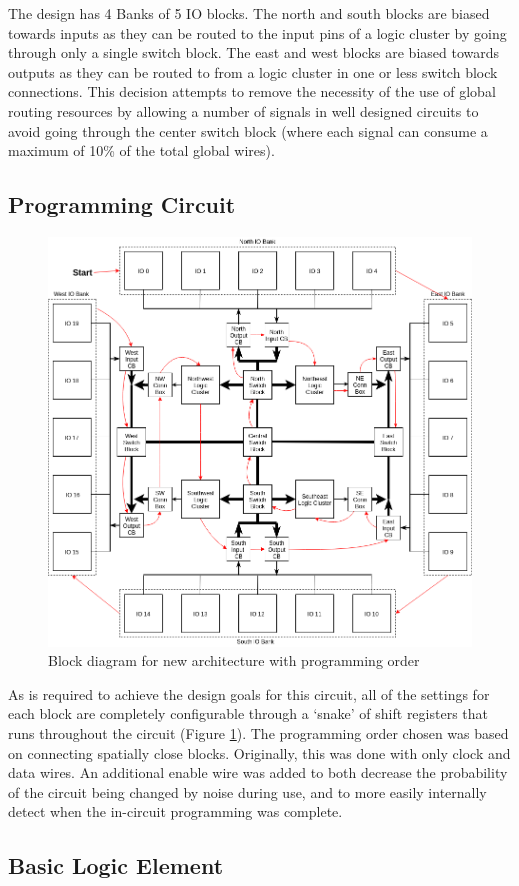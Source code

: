 \documentclass[12pt]{article}
\begin{document}
The design has 4 Banks of 5 IO blocks. The north and south blocks are biased towards inputs
as they can be routed to the input pins of a logic cluster by going through only a single switch
block. The east and west blocks are biased towards outputs as they can be routed to from a logic
cluster in one or less switch block connections. This decision attempts to remove the necessity 
of the use of global routing resources by allowing a number of signals
in well designed circuits to avoid going through the center switch block (where each signal can
consume a maximum of 10\% of the total global wires).

\subsection{Programming Circuit}

\begin{figure}[htb]
  \centering
  \includegraphics[width=.6\textwidth]{prog_diag}
  \caption{Block diagram for new architecture with programming order}
  \label{fig:prog_diag}
\end{figure}

As is required to achieve the design goals for this circuit, all of the settings for
each block are completely configurable through a ‘snake’ of shift registers that runs throughout 
the circuit (Figure \ref{fig:prog_diag}). The programming order chosen was based on connecting
spatially close blocks. Originally, this was done with only clock and data
wires. An additional enable wire was added to both decrease the probability of the circuit
being changed by noise during use, and to more easily internally detect when the
in-circuit programming was complete.

\subsection{Basic Logic Element}
\end{document}
